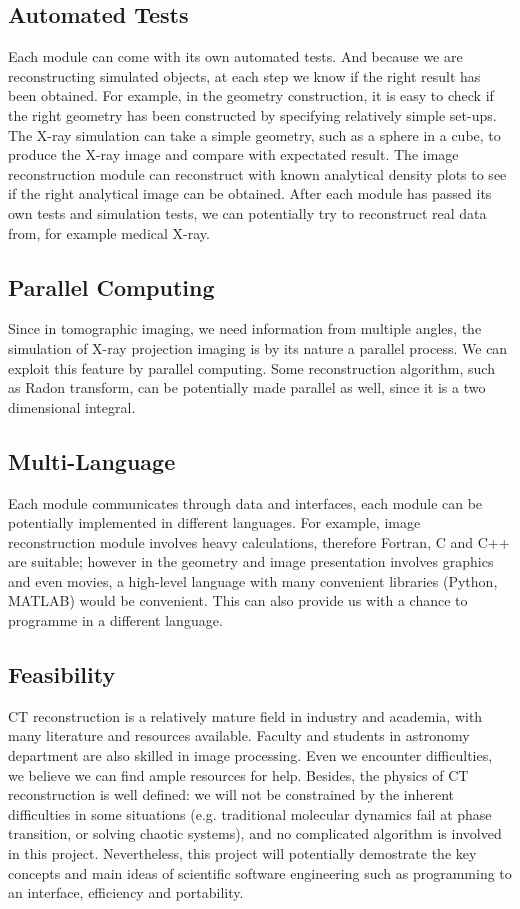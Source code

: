\documentclass[11]{article}
\begin{document}
\subsection{Automated Tests}
	Each module can come with its own automated tests. And because we are reconstructing simulated objects, at each step we know if the right result has been obtained. For example, in the geometry construction, it is easy to check if the right geometry has been constructed by specifying relatively simple set-ups. The X-ray simulation can take a simple geometry, such as a sphere in a cube, to produce the X-ray image and compare with expectated result. The image reconstruction module can reconstruct with known analytical density plots to see if the right analytical image can be obtained. After each module has passed its own tests and simulation tests, we can potentially try to reconstruct real data from, for example medical X-ray.

\subsection{Parallel Computing}
	Since in tomographic imaging, we need information from multiple angles, the simulation of X-ray projection imaging is by its nature a parallel process. We can exploit this feature by parallel computing. Some reconstruction algorithm, such as Radon transform, can be potentially made parallel as well, since it is a two dimensional integral.

\subsection{Multi-Language}
	Each module communicates through data and interfaces, each module can be potentially implemented in different languages. For example, image reconstruction module involves heavy calculations, therefore Fortran, C and C++ are suitable; however in the geometry and image presentation involves graphics and even movies, a high-level language with many convenient libraries (Python, MATLAB) would be convenient. This can also provide us with a chance to programme in a different language.

\subsection{Feasibility}
	CT reconstruction is a relatively mature field in industry and academia, with many literature and resources available. Faculty and students in astronomy department are also skilled in image processing. Even we encounter difficulties, we believe we can find ample resources for help. Besides, the physics of CT reconstruction is well defined: we will not be constrained by the inherent difficulties in some situations (e.g. traditional molecular dynamics fail at phase transition, or solving chaotic systems), and no complicated algorithm is involved in this project. Nevertheless, this project will potentially demostrate the key concepts and main ideas of scientific software engineering such as programming to an interface, efficiency and portability.
	
\end{document}
